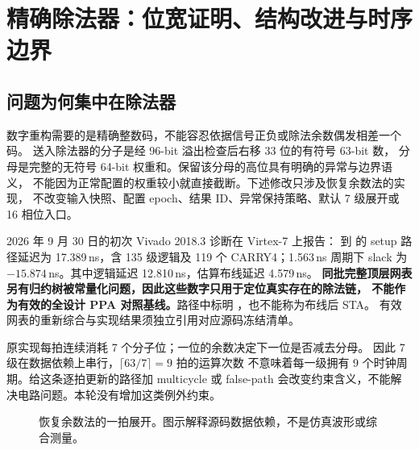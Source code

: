 \chapter{精确除法器：位宽证明、结构改进与时序边界}
\label{chap:divider-timing}

\section{问题为何集中在除法器}
数字重构需要的是精确整数码，不能容忍依据信号正负或除法余数偶发相差一个码。
 送入除法器的分子是经 96-bit 溢出检查后右移 33 位的有符号 63-bit 数，
分母是完整的无符号 64-bit 权重和。保留该分母的高位具有明确的异常与边界语义，
不能因为正常配置的权重较小就直接截断。下述修改只涉及恢复余数法的实现，
不改变输入快照、配置 epoch、结果 ID、异常保持策略、默认 7 级展开或 16 相位入口。

2026 年 9 月 30 日的初次 Vivado 2018.3 诊断在 Virtex-7
 上报告：
到  的 setup 路径延迟为
17.389\,ns，含 135 级逻辑及 119 个 CARRY4；1.563\,ns 周期下 slack 为
$-15.874$\,ns。其中逻辑延迟 12.810\,ns，估算布线延迟 4.579\,ns。
\textbf{同批完整顶层网表另有归约树被常量化问题，因此这些数字只用于定位真实存在的除法链，
不能作为有效的全设计 PPA 对照基线。}路径中标明 ，也不能称为布线后 STA。
有效网表的重新综合与实现结果须独立引用对应源码冻结清单。

原实现每拍连续消耗 7 个分子位；一位的余数决定下一位是否减去分母。
因此 7 级在数据依赖上串行，\(\lceil63/7\rceil=9\) 拍的运算次数
不意味着每一级拥有 9 个时钟周期。给这条逐拍更新的路径加 multicycle 或 false-path
会改变约束含义，不能解决电路问题。本轮没有增加这类例外约束。

\begin{figure}[H]\centering
{}
\caption{恢复余数法的一拍展开。图示解释源码数据依赖，不是仿真波形或综合测量。}
\end{figure}

